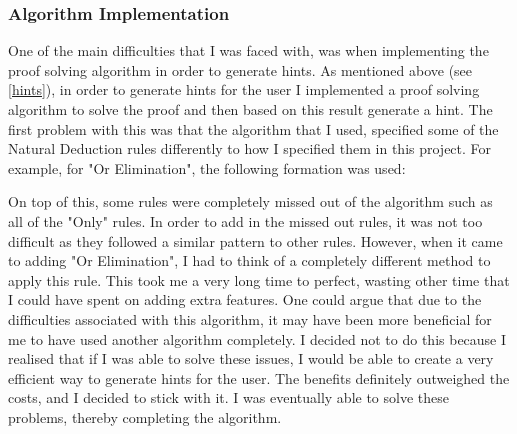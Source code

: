 \subsubsection{Algorithm Implementation}
One of the main difficulties that I was faced with, was when implementing the proof solving algorithm in order to generate hints. As mentioned above (see \ref{hints}), in order to generate hints for the user I implemented a proof solving algorithm to solve the proof and then based on this result generate a hint. The first problem with this was that the algorithm that I used, specified some of the Natural Deduction rules differently to how I specified them in this project. For example, for "Or Elimination", the following formation was used:

	\begin{figure}[!ht]
		\centering
	\begin{bprooftree}
	\end{bprooftree}
	\end{figure}

 On top of this, some rules were completely missed out of the algorithm such as all of the "Only" rules. In order to add in the missed out rules, it was not too difficult as they followed a similar pattern to other rules. However, when it came to adding "Or Elimination", I had to think of a completely different method to apply this rule. This took me a very long time to perfect, wasting other time that I could have spent on adding extra features. One could argue that due to the difficulties associated with this algorithm, it may have been more beneficial for me to have used another algorithm completely. I decided not to do this because I realised that if I was able to solve these issues, I would be able to create a very efficient way to generate hints for the user. The benefits definitely outweighed the costs, and I decided to stick with it. I was eventually able to solve these problems, thereby completing the algorithm. 

